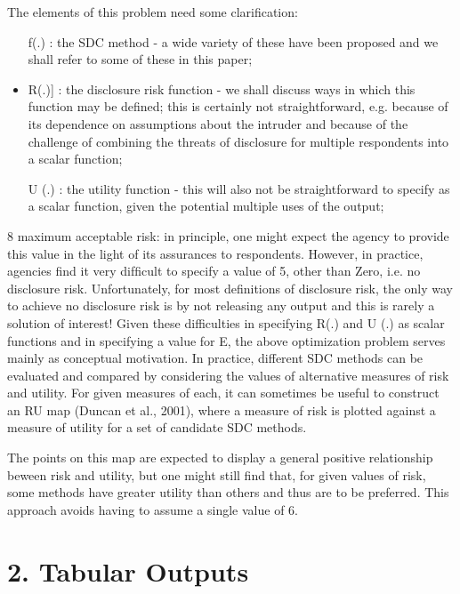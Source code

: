 The elements of this problem need some clarification:
\begin{itemize}
\item[f(.)] : the SDC method - a wide variety of these have been proposed and we shall refer to
some of these in this paper;
\item R(.)] : the disclosure risk function - we shall discuss ways in which this function may be
defined; this is certainly not straightforward, e.g. because of its dependence on
assumptions about the intruder and because of the challenge of combining the
threats of disclosure for multiple respondents into a scalar function;
\item[U (.)] : the utility function - this will also not be straightforward to specify as a scalar
function, given the potential multiple uses of the output;
\end{itemize}
8 maximum acceptable risk: in principle, one might expect the agency to provide this
value in the light of its assurances to respondents. However, in practice, agencies
find it very difﬁcult to specify a value of 5, other than Zero, i.e. no disclosure risk.
Unfortunately, for most definitions of disclosure risk, the only way to achieve no
disclosure risk is by not releasing any output and this is rarely a solution of interest!
Given these difficulties in specifying R(.) and U (.) as scalar functions and in
specifying a value for E, the above optimization problem serves mainly as conceptual
motivation. In practice, different SDC methods can be evaluated and compared by
considering the values of alternative measures of risk and utility. For given measures of
each, it can sometimes be useful to construct an RU map (Duncan et al., 2001), where a
measure of risk is plotted against a measure of utility for a set of candidate SDC methods.

The points on this map are expected to display a general positive relationship beween risk
and utility, but one might still find that, for given values of risk, some methods have
greater utility than others and thus are to be preferred. This approach avoids having to
assume a single value of 6.
\newpage
\section*{2. Tabular Outputs}
